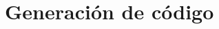 \documentclass[../main.tex]{subfiles}
\begin{document}
\section{Generación de código}
\end{document}
